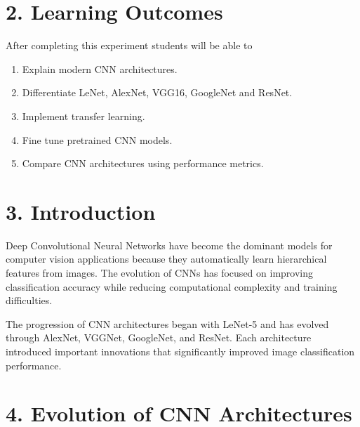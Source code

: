 \documentclass[11pt]{article}
\begin{document}
\section*{2. Learning Outcomes}

After completing this experiment students will be able to

\begin{enumerate}

\item Explain modern CNN architectures.

\item Differentiate LeNet, AlexNet, VGG16, GoogleNet and ResNet.

\item Implement transfer learning.

\item Fine tune pretrained CNN models.

\item Compare CNN architectures using performance metrics.

\end{enumerate}

\section*{3. Introduction}

Deep Convolutional Neural Networks have become the dominant models for
computer vision applications because they automatically learn hierarchical
features from images. The evolution of CNNs has focused on improving
classification accuracy while reducing computational complexity and
training difficulties.

The progression of CNN architectures began with LeNet-5 and has evolved
through AlexNet, VGGNet, GoogleNet, and ResNet. Each architecture
introduced important innovations that significantly improved image
classification performance.

\section*{4. Evolution of CNN Architectures}
\end{document}
